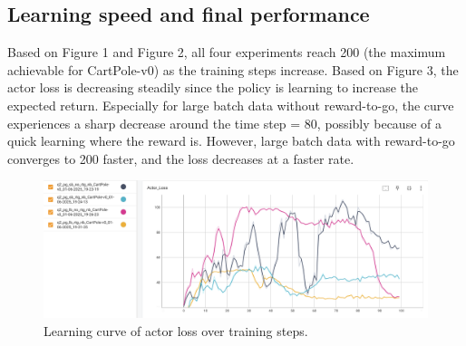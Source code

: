 \documentclass{article} %
\begin{document}
\subsection{Learning speed and final performance}
Based on Figure 1 and Figure 2, all four experiments reach 200 (the maximum achievable for CartPole-v0) as the training steps increase. Based on Figure 3, the actor loss is decreasing steadily since the policy is learning to increase the expected return. Especially for large batch data without reward-to-go, the curve experiences a sharp decrease around the time step = 80, possibly because of a quick learning where the reward is.
However, large batch data with reward-to-go converges to 200 faster, and the loss decreases at a faster rate.  
\begin{figure}[H]
    \centering
    \includegraphics[width=1\linewidth]{Actor_Loss.png}
    \caption{Learning curve of actor loss over training steps.}
    \label{fig:loss}
\end{figure}




\end{document}
